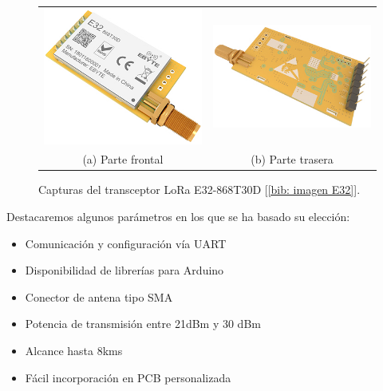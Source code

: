 \documentclass[12pt]{article}
\begin{document}
	\begin{figure}[h!]
		\begin{center}
			\begin{tabular}{cc}
				\includegraphics[width=60mm]{img/e32_front.png} &   \includegraphics[width=60mm]{img/e32_rear.png} \\
				(a) Parte frontal & (b) Parte trasera\\[6pt]
			\end{tabular}
			\caption{Capturas del transceptor LoRa E32-868T30D [\ref{bib: imagen E32}].}
			\label{fig: capturas E32.}
		\end{center}
	\end{figure}	
	
	\noindent Destacaremos algunos parámetros en los que se ha basado su elección: 
	
	\begin{itemize}
		\item Comunicación y configuración vía UART
		\item Disponibilidad de librerías para Arduino
		\item Conector de antena tipo SMA
		\item Potencia de transmisión entre 21dBm y 30 dBm 
		\item Alcance hasta 8kms
		\item Fácil incorporación en PCB personalizada
	\end{itemize}
	
\end{document}
